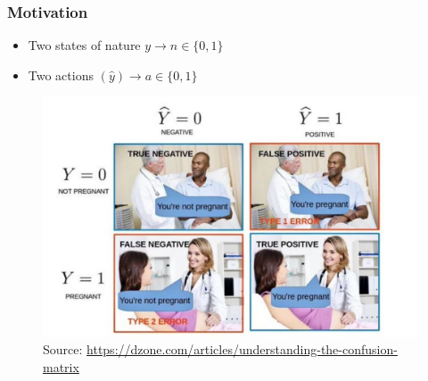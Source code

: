 \documentclass[
  shownotes,
  xcolor={svgnames},
  hyperref={colorlinks,citecolor=DarkBlue,linkcolor=DarkRed,urlcolor=DarkBlue}
  , aspectratio=169]{beamer}
\begin{document}
\begin{frame}[fragile]
\frametitle{Motivation}

\begin{itemize}
  \item Two states of nature $y \rightarrow n\in\{0,1\}$
  \medskip
  \item Two actions $(\hat{y}) \rightarrow a\in \{0,1\}$
\end{itemize}



        \begin{figure}[H] \centering
            \captionsetup{justification=centering}
              \includegraphics[scale=0.4]{../Lecture19/figures/confusion_matrix}
              \\
              \tiny
              Source: \url{https://dzone.com/articles/understanding-the-confusion-matrix}
 \end{figure}

\end{frame}
\end{document}
